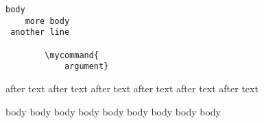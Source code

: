 \begin{verbatim}
body
    more body
 another line

        \mycommand{
            argument}
    \end{verbatim}

    after text after text 
    after text after text 
    after text after text 
    \begin{not}
      body body body
      body body body
      body body body
    \end{not}
